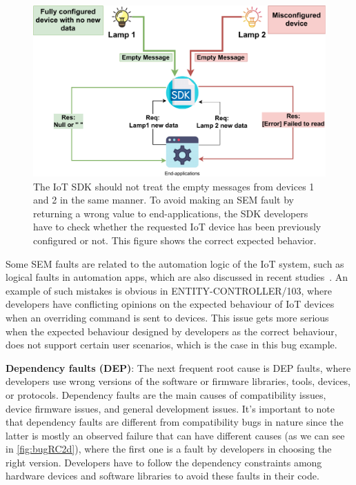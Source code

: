  \begin{figure}[ht]
  \centering
   \includegraphics[width=\linewidth]{imgs/sem.pdf}
  \caption{The IoT SDK should not treat the empty messages from devices 1 and 2 in the same manner. To avoid making an SEM fault by returning a wrong value to end-applications, the SDK developers have to check whether the requested IoT device has been previously configured or not. This figure shows the correct expected behavior.}
  \label{fig:sem}
\end{figure}

Some SEM faults are related to the automation logic of the IoT system, such as logical faults in automation apps, which are also discussed in recent studies~\cite{ISSTA2020Interactions}.  An example of such mistakes is obvious in ENTITY-CONTROLLER/103, where developers have conflicting opinions on the expected behaviour of IoT devices when an overriding command is sent to devices. This issue gets more serious when the expected behaviour designed by developers as the correct behaviour, does not support certain user scenarios, which is the case in this bug example.

\textbf{Dependency faults (DEP)}: The next frequent root cause is DEP faults, where developers use wrong versions of the software or firmware libraries, tools, devices, or protocols. Dependency faults are the main causes of compatibility issues, device firmware issues, and general development issues. It's important to note that dependency faults are different from compatibility bugs in nature since the latter is mostly an observed failure that can have different causes (as we can see in \ref{fig:bugRC2d}), where the first one is a fault by developers in choosing the right version. Developers have to follow the dependency constraints among hardware devices and software libraries to avoid these faults in their code.

